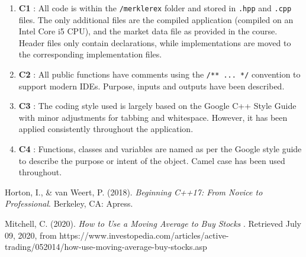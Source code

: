 \begin{enumerate}
	\item \textbf{C1} : All code is within the \texttt{/merklerex} folder and stored in \texttt{.hpp} and \texttt{.cpp} files. The only additional files are the compiled application (compiled on an Intel Core i5 CPU), and the market data file as provided in the course. Header files only contain declarations, while implementations are moved to the corresponding implementation files.
	\item \textbf{C2} : All public functions have comments using the \texttt{/** ... */} convention to support modern IDEs. Purpose, inputs and outputs have been described.
	\item \textbf{C3} : The coding style used is largely based on the Google C++ Style Guide with minor adjustments for tabbing and whitespace. However, it has been applied consistently throughout the application.
	\item \textbf{C4} : Functions, classes and variables are named as per the Google style guide to describe the purpose or intent of the object. Camel case has been used throughout.
\end{enumerate}

\begin{thebibliography}{9}
	Horton, I., \& van Weert, P. (2018). \emph{Beginning C++17: From Novice to Professional}. Berkeley, CA: Apress.
	
	Mitchell, C. (2020). \emph{How to Use a Moving Average to Buy Stocks} . Retrieved July 09, 2020, from https://www.investopedia.com/articles/active-trading/052014/how-use-moving-average-buy-stocks.asp
	
\end{thebibliography}

